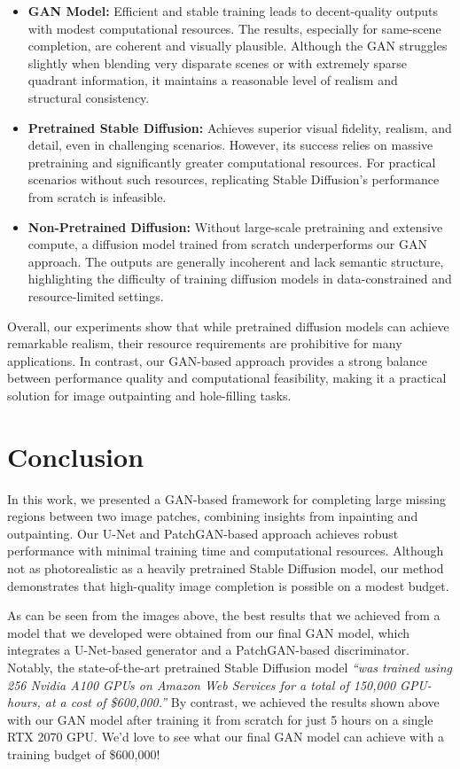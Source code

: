 \documentclass[sigconf]{acmart}
\begin{document}
\begin{itemize}
    \item \textbf{GAN Model:} Efficient and stable training leads to decent-quality outputs with modest computational resources. The results, especially for same-scene completion, are coherent and visually plausible. Although the GAN struggles slightly when blending very disparate scenes or with extremely sparse quadrant information, it maintains a reasonable level of realism and structural consistency.
    
    \item \textbf{Pretrained Stable Diffusion:} Achieves superior visual fidelity, realism, and detail, even in challenging scenarios. However, its success relies on massive pretraining and significantly greater computational resources. For practical scenarios without such resources, replicating Stable Diffusion’s performance from scratch is infeasible.
    
    \item \textbf{Non-Pretrained Diffusion:} Without large-scale pretraining and extensive compute, a diffusion model trained from scratch underperforms our GAN approach. The outputs are generally incoherent and lack semantic structure, highlighting the difficulty of training diffusion models in data-constrained and resource-limited settings.
\end{itemize}

Overall, our experiments show that while pretrained diffusion models can achieve remarkable realism, their resource requirements are prohibitive for many applications. In contrast, our GAN-based approach provides a strong balance between performance quality and computational feasibility, making it a practical solution for image outpainting and hole-filling tasks.

\section{Conclusion}
In this work, we presented a GAN-based framework for completing large missing regions between two image patches, combining insights from inpainting and outpainting. Our U-Net and PatchGAN-based approach achieves robust performance with minimal training time and computational resources. Although not as photorealistic as a heavily pretrained Stable Diffusion model, our method demonstrates that high-quality image completion is possible on a modest budget.

As can be seen from the images above, the best results that we achieved from a model that we developed were obtained from our final GAN model, which integrates a U-Net-based generator and a PatchGAN-based discriminator. Notably, the state-of-the-art pretrained Stable Diffusion model \textit{“was trained using 256 Nvidia A100 GPUs on Amazon Web Services for a total of 150,000 GPU-hours, at a cost of \$600,000.”} By contrast, we achieved the results shown above with our GAN model after training it from scratch for just 5 hours on a single RTX 2070 GPU. We’d love to see what our final GAN model can achieve with a training budget of \$600,000!
\end{document}
